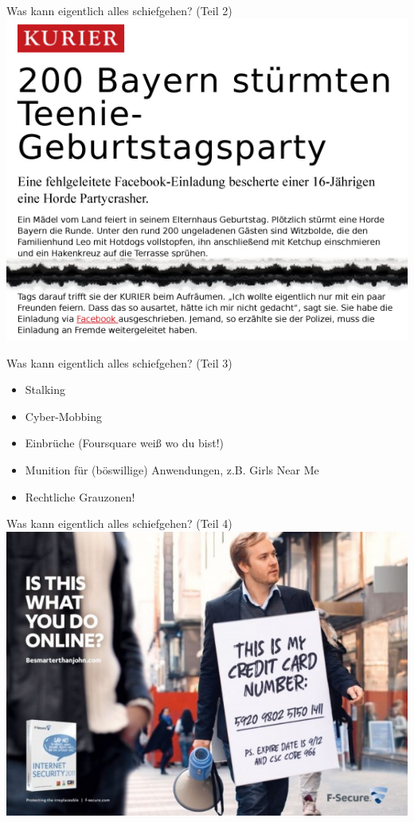 \begin{frame}
	Was kann eigentlich alles schiefgehen? (Teil 2)\\
		\includegraphics[scale=0.5]{facebook-news/facebook-party-200Bayern.jpg}
\end{frame}

\begin{frame}
	Was kann eigentlich alles schiefgehen? (Teil 3)
	\begin{itemize}
		\item Stalking
		\item Cyber-Mobbing
		\item Einbrüche (Foursquare weiß wo du bist!)
		\item Munition für (böswillige) Anwendungen, z.B. Girls Near Me
		\item Rechtliche Grauzonen!
	\end{itemize}
\end{frame}

\begin{frame}
	Was kann eigentlich alles schiefgehen? (Teil 4)
	\includegraphics[scale=0.5]{socialmedia-memes/whatyoudoonline.jpg}
\end{frame}


